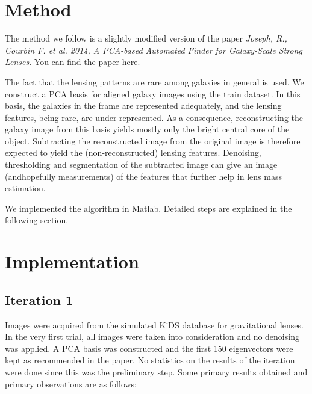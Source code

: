 \documentclass[11pt, a4paper]{article}
\begin{document}
\section{Method}
The method we follow is a slightly modified version of the paper \textit{Joseph, R., Courbin F. et al. 2014, A PCA-based Automated Finder for Galaxy-Scale Strong Lenses}. You can find the paper \href{http://arxiv.org/pdf/1403.1063v1.pdf}{here}.

The fact that the lensing patterns are rare among galaxies in general is used. We construct a PCA basis for aligned galaxy images using the train dataset. In this basis, the galaxies in the frame are represented adequately, and the lensing features, being rare, are under-represented. As a consequence, reconstructing the galaxy image from this basis yields mostly only the bright central core of the object. Subtracting the reconstructed image from the original image is therefore expected to yield the (non-reconstructed) lensing features. Denoising, thresholding and segmentation of the subtracted image can give an image (andhopefully measurements) of the features that further help in lens mass estimation.

We implemented the algorithm in Matlab. Detailed steps are explained in the following section.

\section{Implementation}

\subsection{Iteration 1}

Images were acquired from the simulated KiDS database for gravitational lenses. In the very first trial, all images were taken into consideration and no denoising was applied. A PCA basis was constructed and the first 150 eigenvectors were kept as recommended in the paper. No statistics on the results of the iteration were done since this was the preliminary step. Some primary results obtained and primary observations are as follows:
\end{document}
